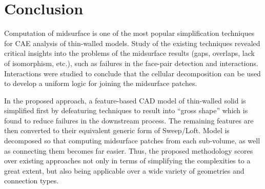 \section{Conclusion}


Computation of midsurface is one of the most popular simplification techniques for CAE analysis of  thin-walled models. Study of the existing techniques revealed critical insights into the problems of the  midsurface results (gaps, overlaps, lack of isomorphism, etc.), such as failures in the face-pair detection and interactions. Interactions were studied to conclude that the cellular decomposition can be used to develop a uniform logic for joining the midsurface patches.

In the proposed approach, a feature-based  CAD model of thin-walled solid is simplified first by defeaturing techniques to result into ``gross shape'' which is found to reduce failures in the  downstream process. The remaining features are then converted to their equivalent generic form of Sweep/Loft.  Model is decomposed so that computing midsurface patches from each sub-volume, as well as connecting them becomes far easier.  Thus, the proposed methodology scores over existing approaches not only in terms of simplifying the complexities to a great extent, but also being applicable over a wide variety of geometries and connection types. %


